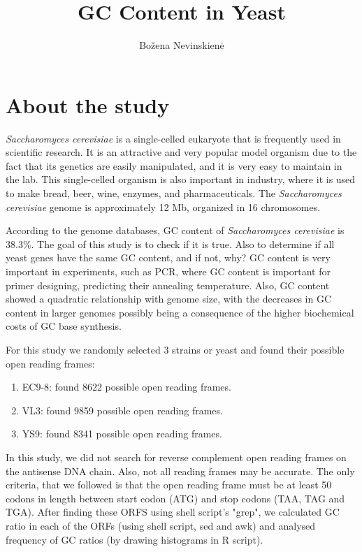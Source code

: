 \documentclass{article}
\begin{document}
\title{GC Content in Yeast}
\author{Bo\v{z}ena Nevinskien\.{e}}
\maketitle

\section{About the study}
\emph{Saccharomyces cerevisiae} is a single-celled eukaryote that is frequently used in scientific research. It is an attractive and very popular model organism due to the fact that its genetics are easily manipulated, and it is very easy to maintain in the lab. 
This single-celled organism is also important in industry, where it is used to make bread, beer, wine, enzymes, and pharmaceuticals. The \emph{Saccharomyces cerevisiae} genome is approximately 12 Mb, organized in 16 chromosomes.


According to the genome databases, GC content of \emph{Saccharomyces cerevisiae} is 38.3\%. 
The goal of this study is to check if it is true. 
Also to determine if all yeast genes have the same GC content, and if not, why? 
GC content is very important in experiments, such as PCR, where GC content is important for primer designing, predicting their annealing temperature. Also, GC content showed a quadratic relationship with genome size, with the decreases in GC content in larger genomes possibly being a consequence of the higher biochemical costs of GC base synthesis.

For this study we randomly selected 3 strains or yeast and found their possible open reading frames:
\begin{enumerate}
	\item EC9-8: found 8622 possible open reading frames.
	\item VL3: found 9859 possible open reading frames.
	\item YS9: found 8341 possible open reading frames.
\end{enumerate}

In this study, we did not search for reverse complement open reading frames on the antisense DNA chain.                    
Also, not all reading frames may be accurate. The only criteria, that we followed is that the open reading frame must be
at least 50 codons in length between start codon (ATG) and stop codons (TAA, TAG and TGA).
After finding these ORFS using shell script's "grep", we calculated GC ratio in each of the ORFs (using shell script, sed and awk) and analysed frequency of GC ratios (by drawing histograms in R script).
\end{document}

